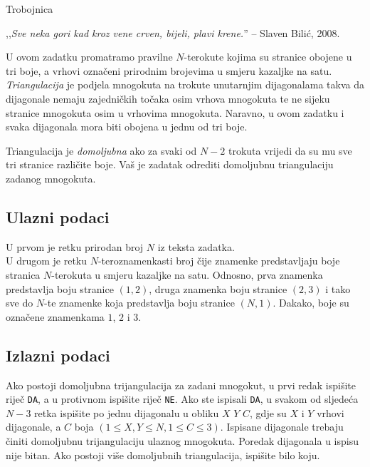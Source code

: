 \begin{statement}[
  problempoints=110,
  timelimit=1 sekunda,
  memorylimit=512 MiB,
]{Trobojnica}


,,\textit{Sve neka gori kad kroz vene crven, bijeli, plavi krene.}''
-- Slaven Bilić, 2008.

U ovom zadatku promatramo pravilne $N$-terokute kojima su stranice obojene u tri
boje, a vrhovi označeni prirodnim brojevima u smjeru kazaljke na satu.
\textit{Triangulacija} je podjela mnogokuta na trokute unutarnjim
dijagonalama takva da dijagonale nemaju zajedničkih točaka osim vrhova mnogokuta
te ne sijeku stranice mnogokuta osim u vrhovima mnogokuta. Naravno, u ovom
zadatku i svaka dijagonala mora biti obojena u jednu od tri boje.

Triangulacija je \textit{domoljubna} ako za svaki od $N-2$ trokuta vrijedi da su
mu sve tri stranice različite boje. Vaš je zadatak odrediti domoljubnu
triangulaciju zadanog mnogokuta.

\subsection*{Ulazni podaci}
U prvom je retku prirodan broj $N$ iz teksta zadatka. \\
U drugom je retku $N$-teroznamenkasti broj čije znamenke predstavljaju boje
stranica $N$-terokuta u smjeru kazaljke na satu. Odnosno, prva znamenka
predstavlja boju stranice $(1,2)$, druga znamenka boju stranice $(2,3)$ i tako
sve do $N$-te znamenke koja predstavlja boju stranice $(N, 1)$. Dakako, boje su
označene znamenkama $1$, $2$ i $3$.

\subsection*{Izlazni podaci}
Ako postoji domoljubna trijangulacija za zadani mnogokut, u prvi redak ispišite
riječ \texttt{DA}, a u protivnom ispišite riječ \texttt{NE}. Ako ste ispisali
\texttt{DA}, u svakom od sljedeća $N-3$ retka ispišite po jednu
dijagonalu u obliku $X$ $Y$ $C$, gdje su $X$ i $Y$ vrhovi dijagonale, a $C$ boja
$(1 \le X, Y \le N, 1 \le C \le 3)$. Ispisane dijagonale trebaju činiti
domoljubnu trijangulaciju ulaznog mnogokuta. Poredak dijagonala u ispisu nije
bitan. Ako postoji više domoljubnih triangulacija, ispišite bilo koju.


\end{statement}

